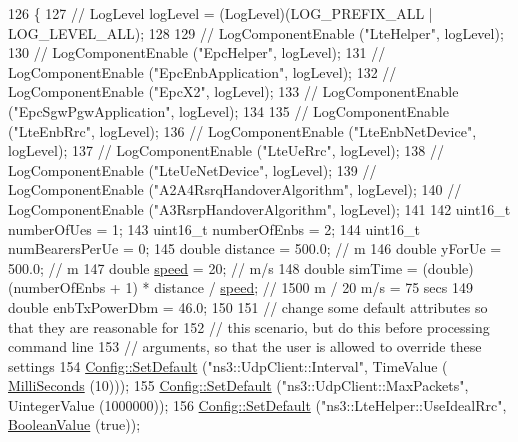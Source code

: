 \begin{DoxyCode}
126 \{
127   \textcolor{comment}{// LogLevel logLevel = (LogLevel)(LOG\_PREFIX\_ALL | LOG\_LEVEL\_ALL);}
128 
129   \textcolor{comment}{// LogComponentEnable ("LteHelper", logLevel);}
130   \textcolor{comment}{// LogComponentEnable ("EpcHelper", logLevel);}
131   \textcolor{comment}{// LogComponentEnable ("EpcEnbApplication", logLevel);}
132   \textcolor{comment}{// LogComponentEnable ("EpcX2", logLevel);}
133   \textcolor{comment}{// LogComponentEnable ("EpcSgwPgwApplication", logLevel);}
134 
135   \textcolor{comment}{// LogComponentEnable ("LteEnbRrc", logLevel);}
136   \textcolor{comment}{// LogComponentEnable ("LteEnbNetDevice", logLevel);}
137   \textcolor{comment}{// LogComponentEnable ("LteUeRrc", logLevel);}
138   \textcolor{comment}{// LogComponentEnable ("LteUeNetDevice", logLevel);}
139   \textcolor{comment}{// LogComponentEnable ("A2A4RsrqHandoverAlgorithm", logLevel);}
140   \textcolor{comment}{// LogComponentEnable ("A3RsrpHandoverAlgorithm", logLevel);}
141 
142   uint16\_t numberOfUes = 1;
143   uint16\_t numberOfEnbs = 2;
144   uint16\_t numBearersPerUe = 0;
145   \textcolor{keywordtype}{double} distance = 500.0; \textcolor{comment}{// m}
146   \textcolor{keywordtype}{double} yForUe = 500.0;   \textcolor{comment}{// m}
147   \textcolor{keywordtype}{double} \hyperlink{mmwave-amc-test_8cc_a6dc6e6f3c75c509ce943163afb5dade7}{speed} = 20;       \textcolor{comment}{// m/s}
148   \textcolor{keywordtype}{double} simTime = (double)(numberOfEnbs + 1) * distance / \hyperlink{mmwave-amc-test_8cc_a6dc6e6f3c75c509ce943163afb5dade7}{speed}; \textcolor{comment}{// 1500 m / 20 m/s = 75 secs}
149   \textcolor{keywordtype}{double} enbTxPowerDbm = 46.0;
150 
151   \textcolor{comment}{// change some default attributes so that they are reasonable for}
152   \textcolor{comment}{// this scenario, but do this before processing command line}
153   \textcolor{comment}{// arguments, so that the user is allowed to override these settings}
154   \hyperlink{group__config_ga2e7882df849d8ba4aaad31c934c40c06}{Config::SetDefault} (\textcolor{stringliteral}{"ns3::UdpClient::Interval"}, TimeValue (
      \hyperlink{group__timecivil_gaf26127cf4571146b83a92ee18679c7a9}{MilliSeconds} (10)));
155   \hyperlink{group__config_ga2e7882df849d8ba4aaad31c934c40c06}{Config::SetDefault} (\textcolor{stringliteral}{"ns3::UdpClient::MaxPackets"}, UintegerValue (1000000));
156   \hyperlink{group__config_ga2e7882df849d8ba4aaad31c934c40c06}{Config::SetDefault} (\textcolor{stringliteral}{"ns3::LteHelper::UseIdealRrc"}, 
      \hyperlink{classns3_1_1BooleanValue}{BooleanValue} (\textcolor{keyword}{true}));

\end{DoxyCode}
